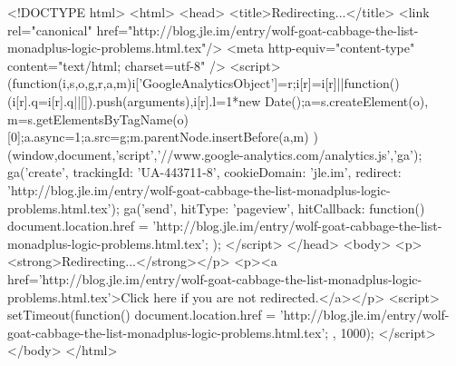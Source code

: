 <!DOCTYPE html>
<html>
<head>
<title>Redirecting...</title>
<link rel="canonical" href="http://blog.jle.im/entry/wolf-goat-cabbage-the-list-monadplus-logic-problems.html.tex"/>
<meta http-equiv="content-type" content="text/html; charset=utf-8" />
<script>
(function(i,s,o,g,r,a,m){i['GoogleAnalyticsObject']=r;i[r]=i[r]||function(){
(i[r].q=i[r].q||[]).push(arguments)},i[r].l=1*new Date();a=s.createElement(o),
m=s.getElementsByTagName(o)[0];a.async=1;a.src=g;m.parentNode.insertBefore(a,m)
})(window,document,'script','//www.google-analytics.com/analytics.js','ga');
ga('create', { trackingId: 'UA-443711-8', cookieDomain: 'jle.im', redirect: 'http://blog.jle.im/entry/wolf-goat-cabbage-the-list-monadplus-logic-problems.html.tex'});
ga('send', { hitType: 'pageview', hitCallback: function() { document.location.href = 'http://blog.jle.im/entry/wolf-goat-cabbage-the-list-monadplus-logic-problems.html.tex'; } });
</script>
</head>
<body>
  <p><strong>Redirecting...</strong></p>
  <p><a href='http://blog.jle.im/entry/wolf-goat-cabbage-the-list-monadplus-logic-problems.html.tex'>Click here if you are not redirected.</a></p>
  <script>
    setTimeout(function() { document.location.href = 'http://blog.jle.im/entry/wolf-goat-cabbage-the-list-monadplus-logic-problems.html.tex'; }, 1000);
  </script>
</body>
</html>
